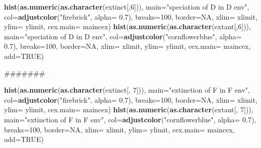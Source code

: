 \documentclass[]{book}
\newenvironment{Shaded}{\begin{snugshade}}{\end{snugshade}}
\newcommand{\KeywordTok}[1]{\textcolor[rgb]{0.13,0.29,0.53}{\textbf{{#1}}}}
\newcommand{\DataTypeTok}[1]{\textcolor[rgb]{0.13,0.29,0.53}{{#1}}}
\newcommand{\DecValTok}[1]{\textcolor[rgb]{0.00,0.00,0.81}{{#1}}}
\newcommand{\FloatTok}[1]{\textcolor[rgb]{0.00,0.00,0.81}{{#1}}}
\newcommand{\StringTok}[1]{\textcolor[rgb]{0.31,0.60,0.02}{{#1}}}
\newcommand{\OtherTok}[1]{\textcolor[rgb]{0.56,0.35,0.01}{{#1}}}
\newcommand{\NormalTok}[1]{{#1}}
\theoremstyle{definition}
\theoremstyle{definition}
\theoremstyle{definition}
\theoremstyle{remark}
\begin{document}
\begin{Shaded}
\begin{Highlighting}[]
\KeywordTok{hist}\NormalTok{(}\KeywordTok{as.numeric}\NormalTok{(}\KeywordTok{as.character}\NormalTok{(extinct[,}\DecValTok{6}\NormalTok{])), }\DataTypeTok{main=}\StringTok{"speciation of D in D env"}\NormalTok{, }\DataTypeTok{col=}\KeywordTok{adjustcolor}\NormalTok{(}\StringTok{"firebrick"}\NormalTok{, }\DataTypeTok{alpha=} \FloatTok{0.7}\NormalTok{), }\DataTypeTok{breaks=}\DecValTok{100}\NormalTok{, }\DataTypeTok{border=}\OtherTok{NA}\NormalTok{, }\DataTypeTok{xlim=}\NormalTok{ xlimit, }\DataTypeTok{ylim=}\NormalTok{ ylimit, }\DataTypeTok{cex.main=}\NormalTok{ maincex)}
\KeywordTok{hist}\NormalTok{(}\KeywordTok{as.numeric}\NormalTok{(}\KeywordTok{as.character}\NormalTok{(extant[,}\DecValTok{6}\NormalTok{])), }\DataTypeTok{main=}\StringTok{"speciation of D in D env"}\NormalTok{, }\DataTypeTok{col=}\KeywordTok{adjustcolor}\NormalTok{(}\StringTok{"cornflowerblue"}\NormalTok{, }\DataTypeTok{alpha=} \FloatTok{0.7}\NormalTok{), }\DataTypeTok{breaks=}\DecValTok{100}\NormalTok{, }\DataTypeTok{border=}\OtherTok{NA}\NormalTok{, }\DataTypeTok{xlim=}\NormalTok{ xlimit, }\DataTypeTok{ylim=}\NormalTok{ ylimit, }\DataTypeTok{cex.main=}\NormalTok{ maincex, }\DataTypeTok{add=}\OtherTok{TRUE}\NormalTok{)}

\NormalTok{#######}

\KeywordTok{hist}\NormalTok{(}\KeywordTok{as.numeric}\NormalTok{(}\KeywordTok{as.character}\NormalTok{(extinct[, }\DecValTok{7}\NormalTok{])), }\DataTypeTok{main=}\StringTok{"extinction of F in F env"}\NormalTok{, }\DataTypeTok{col=}\KeywordTok{adjustcolor}\NormalTok{(}\StringTok{"firebrick"}\NormalTok{, }\DataTypeTok{alpha=} \FloatTok{0.7}\NormalTok{), }\DataTypeTok{breaks=}\DecValTok{100}\NormalTok{, }\DataTypeTok{border=}\OtherTok{NA}\NormalTok{, }\DataTypeTok{xlim=}\NormalTok{ xlimit, }\DataTypeTok{ylim=}\NormalTok{ ylimit, }\DataTypeTok{cex.main=}\NormalTok{ maincex)}
\KeywordTok{hist}\NormalTok{(}\KeywordTok{as.numeric}\NormalTok{(}\KeywordTok{as.character}\NormalTok{(extant[, }\DecValTok{7}\NormalTok{])), }\DataTypeTok{main=}\StringTok{"extinction of F in F env"}\NormalTok{, }\DataTypeTok{col=}\KeywordTok{adjustcolor}\NormalTok{(}\StringTok{"cornflowerblue"}\NormalTok{, }\DataTypeTok{alpha=} \FloatTok{0.7}\NormalTok{), }\DataTypeTok{breaks=}\DecValTok{100}\NormalTok{, }\DataTypeTok{border=}\OtherTok{NA}\NormalTok{, }\DataTypeTok{xlim=}\NormalTok{ xlimit, }\DataTypeTok{ylim=}\NormalTok{ ylimit, }\DataTypeTok{cex.main=}\NormalTok{ maincex, }\DataTypeTok{add=}\OtherTok{TRUE}\NormalTok{)}



\end{Highlighting}
\end{Shaded}
\end{document}
